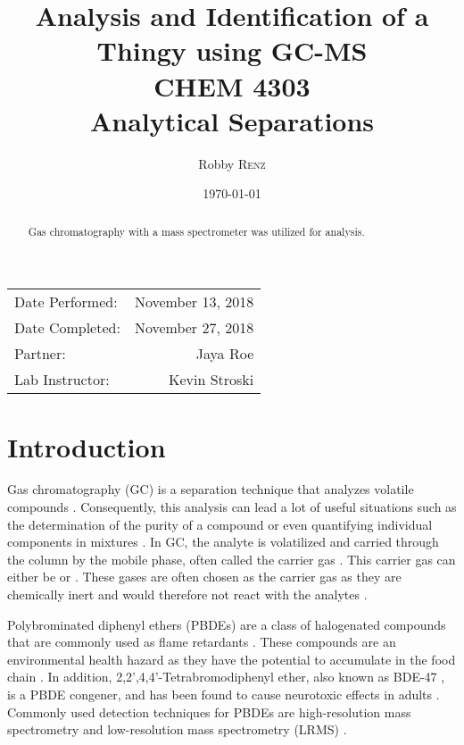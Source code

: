 \documentclass[a4paper, 12pt]{article}
\title{Analysis and Identification of a Thingy using GC-MS \\ CHEM 4303 \\ Analytical Separations} %
\author{Robby \textsc{Renz}} %
\date{\today} %
\begin{document}
\maketitle %

\begin{center}
\begin{tabular}{l r}
Date Performed: & November 13, 2018 \\ %
Date Completed: & November 27, 2018 \\
Partner: & Jaya Roe \\ %
Lab Instructor: & Kevin Stroski %
\end{tabular}
\end{center}


\begin{abstract}
	Gas chromatography with a mass spectrometer was utilized for analysis.
\end{abstract}
\newpage


\section{Introduction}
Gas chromatography (GC) is a separation technique that analyzes volatile compounds \cite{vitha_chromatography:_2017}. Consequently, this analysis can lead a lot of useful situations such as the determination of the purity of a compound or even quantifying individual components in mixtures \cite{vitha_chromatography:_2017}. In GC, the analyte is volatilized and carried through the column by the mobile phase, often called the carrier gas \cite{harris}. This carrier gas can either be  or  \cite{harris}. These gases are often chosen as the carrier gas as they are chemically inert and would therefore not react with the analytes \cite{vitha_chromatography:_2017}.

Polybrominated diphenyl ethers (PBDEs) are a class of halogenated compounds that are commonly used as flame retardants \cite{bjorklund_mass_2003}. These compounds are an environmental health hazard as they have the potential to accumulate in the food chain \cite{thomsen_comparing_2002}. In addition, 2,2',4,4'-Tetrabromodiphenyl ether, also known as BDE-47 \cite{rat}, is a PBDE congener, and has been found to cause neurotoxic effects in adults \cite{thomsen_comparing_2002}. Commonly used detection techniques for PBDEs are high-resolution mass spectrometry and low-resolution mass spectrometry (LRMS) \cite{bjorklund_mass_2003}.
\end{document}
